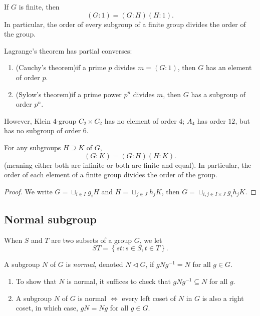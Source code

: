 \begin{theorem}[Lagrange]
  If \( G \) is finite, then
  \[
    (G : 1) = (G : H)(H : 1).
  \]
  In particular, the order of every subgroup of a finite group divides the order of the group.
\end{theorem}
\begin{remark}
  Lagrange's theorem has partial converses:
  \begin{enumerate}
    \item (Cauchy's theorem)if a prime \( p \) divides \( m = (G: 1) \), then \( G \) has an element of order \( p \).
    \item (Sylow's theorem)if a prime power \( p^n \) divides \( m \), then \( G \) has a subgroup of order \( p^n \).
  \end{enumerate}
  However, Klein \( 4 \)-group \( C_2 \times C_2 \) has no element of order \( 4 \); \( A_4 \) has order \( 12 \), but has no subgroup of order \( 6 \).
\end{remark}

\begin{proposition}
  For any subgroups \( H \supseteq K \) of \( G \), 
  \[
    (G: K) = (G: H)(H: K).
  \]
  (meaning either both are infinite or both are finite and equal). In
  particular, the order of each element of a finite group divides the order of
  the group.
\end{proposition}
\begin{proof}
  We write \( G = \sqcup_{i \in I} g_i H \) and \( H = \sqcup_{j \in J} h_jK \), then \( G = \sqcup_{i, j \in I \times J} g_i h_j K \).
\end{proof}

\subsection{Normal subgroup}

When \( S \) and \( T \) are two subsets of a group \( G \), we let
\[
  ST = \left\lbrace st: s \in S, t \in T \right\rbrace.
\]
\begin{definition}
  A subgroup \( N \) of \( G \) is \emph{normal}, denoted \( N \triangleleft G \), if \( gNg^{-1} = N \) for all \( g \in G \).
\end{definition}

\begin{proposition}
  \begin{enumerate}
    \item To show that \( N \) is normal, it suffices to check that \( g N
      g^{-1}
  \subseteq N \) for all \( g \).
    \item A subgroup \( N \) of \( G \) is normal \( \iff \) every left coset of
      \( N \) in \( G \) is also a right coset, in which case, \( gN = N g \)
      for all \( g \in G \).
  \end{enumerate}
\end{proposition}

